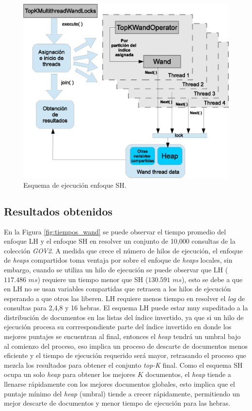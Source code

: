 \begin{figure}[tp]
\centering
\includegraphics[scale=.75]{images/ejecucion_topkmultithreadwandopCOMPARTIDO.eps}
\caption{Esquema de ejecución enfoque SH.}
\label{fig:esquema_ejecucion_wandsh}
\end{figure}


\subsection{Resultados obtenidos}
\label{evaluacionexperimental:resultadosObtenidos}
En la Figura \ref{fig:tiempos_wand} se puede observar el tiempo promedio del enfoque LH y el enfoque SH en resolver un conjunto de 10,000 consultas de la colección \textit{GOV2}. A medida que crece el número de hilos de ejecución, el enfoque de \textit{heaps} compartidos toma ventaja por sobre el enfoque de \textit{heaps} locales, sin embargo, cuando se utiliza un hilo de ejecución se puede observar que LH ($117.486$ $ms$) requiere un tiempo menor que SH ($130.591$ $ms$), esto se debe a que en LH no se usan variables compartidas que retrasen a los hilos de ejecución esperando a que otros las liberen. LH requiere menos tiempo en resolver el \textit{log} de consultas para 2,4,8 y 16 hebras. 
El esquema LH puede estar muy supeditado a la distribución de documentos en las listas del índice invertido, ya que si un hilo de ejecución procesa su corrrespondiente parte del índice invertido en donde los mejores puntajes se encuentran al final, entonces el \textit{heap} tendrá un umbral bajo al comienzo del proceso, eso implica un proceso de descarte de documentos menos eficiente y el tiempo de ejecución requerido será mayor, retrasando el proceso que mezcla los resultados para obtener el conjunto \textit{top-K} final. 
Como el esquema SH ocupa un solo \textit{heap} para obtener los mejores $K$ documentos, el \textit{heap} tiende a llenarse rápidamente con los mejores documentos globales, esto implica que el puntaje mínimo del \textit{heap} (umbral) tiende a crecer rápidamente, permitiendo un mejor descarte de documentos y menor tiempo de ejecución para las hebras. 

